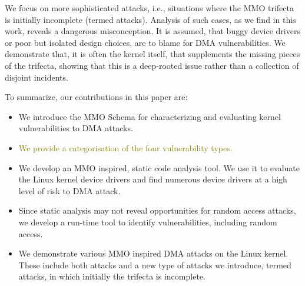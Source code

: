 We focus on more sophisticated attacks, i.e., situations where the MMO trifecta is initially incomplete (termed \compound attacks).
Analysis of such cases, as we find in this work, reveals a dangerous misconception. It is assumed, that buggy device drivers or poor but isolated design choices, are to blame for DMA vulnerabilities. 
We demonstrate that, it is often the kernel itself, that supplements the missing pieces of the trifecta, showing that this is a deep-rooted issue rather than a collection of disjoint incidents.

%
To summarize, our contributions in this paper are:
\begin{itemize}
    \item We introduce the MMO Schema for characterizing and evaluating kernel vulnerabilities to DMA attacks.
    \item \textcolor{olive}{We provide a categorisation of the four \subpage{} vulnerability types.}
    \item We develop an MMO inspired, static code analysis tool. We use it to evaluate the Linux kernel device drivers and find numerous device drivers at a high level of risk to DMA attack.
    \item Since static analysis may not reveal opportunities for random access attacks, we develop a run-time tool to identify \subpage{} vulnerabilities, including random access.
    \item We demonstrate various MMO inspired DMA attacks on the Linux kernel. These include both \simple{} attacks and a new type of attacks we introduce, termed \compound{} attacks, in which initially the trifecta is incomplete. 
\end{itemize}



